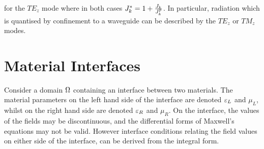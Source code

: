 for the $TE_z$ mode where in both cases $J_{k}^* = 1 + \frac{J_{k}}{J^p_{k}}$.
In particular, radiation which is quantised by confinement to a waveguide can be described by the $TE_z$ or $TM_z$ modes.
\section{Material Interfaces}
Consider a domain $\Omega$ containing an interface between two materials. The material parameters on the left hand side of the interface are denoted $\varepsilon_L$ and $\mu_L$, whilst on the right hand side are denoted $\varepsilon_R$ and $\mu_R$. On the interface, the values of the fields may be
discontinuous, and the differential forms of Maxwell's equations may not be
valid. However interface conditions relating the field values on either side of
the interface, can be derived from the integral form.

